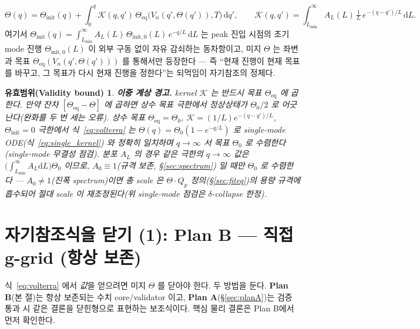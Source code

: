 \documentclass[11pt,a4paper]{article}
\newtheorem*{boundbox}{유효범위(Validity bound)}
\newcommand{\dd}{\mathrm{d}}
\newcommand{\eq}{\mathrm{eq}}
\begin{document}
\begin{equation}
\Theta(q)=\Theta_\mathrm{init}(q)+\int_0^q \mathcal K(q,q')\,\Theta_\eq\big(V_n(q',\Theta(q')),T\big)\,\dd q',
\qquad \mathcal K(q,q')=\int_{L_{\min}}^\infty A_L(L)\,\tfrac1L\,e^{-(q-q')/L}\,\dd L.
\label{eq:volterra}
\end{equation}
여기서 $\Theta_\mathrm{init}(q)=\int_{L_{\min}}^\infty A_L(L)\,\Theta_{\mathrm{init},0}(L)\,e^{-q/L}\,\dd L$ 는 peak 진입 시점의 초기 mode
진행 $\Theta_{\mathrm{init},0}(L)$ 이 외부 구동 없이 자유 감쇠하는 동차항이고, 미지 $\Theta$ 는 좌변과 목표
$\Theta_\eq(V_n(q',\Theta(q')))$ 를 통해서만 등장한다 — 즉 ``현재 진행이 현재 목표를 바꾸고, 그 목표가 다시
현재 진행을 정한다''는 되먹임이 자기참조의 정체다.
\begin{boundbox}
\textbf{이중 계상 경고.} kernel $\mathcal K$ 는 반드시 \emph{목표} $\Theta_\eq$ 에 곱한다. 만약 잔차
$[\Theta_\eq-\Theta]$ 에 곱하면 상수 목표 극한에서 정상상태가 $\Theta_0/2$ 로 어긋난다(완화를 두 번 세는
오류). 상수 목표 $\Theta_\eq=\Theta_0$, $\mathcal K=(1/L)e^{-(q-q')/L}$, $\Theta_\mathrm{init}=0$ 극한에서
식~\eqref{eq:volterra} 는 $\Theta(q)=\Theta_0(1-e^{-q/L})$ 로 single-mode ODE(식~\eqref{eq:single_kernel})
와 정확히 일치하며 $q\to\infty$ 서 목표 $\Theta_0$ 로 수렴한다(single-mode 무결성 점검). \emph{분포} $A_L$ 의 경우
같은 극한의 $q\to\infty$ 값은 $\big(\int_{L_{\min}}^\infty A_L\dd L\big)\Theta_0$ 이므로, $A_0\equiv1$(규격 보존, \S\ref{sec:spectrum})
일 때만 $\Theta_0$ 로 수렴한다 — $A_0\ne1$(진폭 spectrum)이면 총 scale 은 $\Theta\cdot Q_p$ 정의(\S\ref{sec:fiteq})의
용량 규격에 흡수되어 절대 scale 이 재조정된다(위 single-mode 점검은 $\delta$-collapse 한정).
\end{boundbox}
\section{자기참조식을 닫기 (1): Plan B — 직접 g-grid (항상 보존)}\label{sec:planB}
식~\eqref{eq:volterra} 에서 \emph{값}을 얻으려면 미지 $\Theta$ 를 닫아야 한다. 두 방법을 둔다.
\textbf{Plan B}(본 절)는 항상 보존되는 수치 core/validator 이고, \textbf{Plan A}(\S\ref{sec:planA})는
검증 통과 시 같은 결론을 닫힌형으로 표현하는 보조식이다. 핵심 물리 결론은 Plan B에서 먼저 확인한다.
\end{document}
